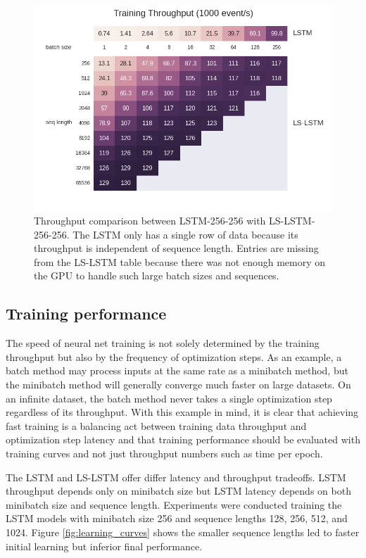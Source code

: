 \documentclass{article}
\begin{document}
\begin{figure}[t]
\centering
\includegraphics[width=12cm]{heatmap.png}
\caption{Throughput comparison between LSTM-256-256 with LS-LSTM-256-256. The LSTM only has a single row of data because its throughput is independent of sequence length. Entries are missing from the LS-LSTM table because there was not enough memory on the GPU to handle such large batch sizes and sequences.}
\label{fig:tp_perf}
\end{figure}

\subsection{Training performance}
The speed of neural net training is not solely determined by the training throughput but also by the frequency of optimization steps. As an example, a batch method may process inputs at the same rate as a minibatch method, but the minibatch method will generally converge much faster on large datasets. On an infinite dataset, the batch method never takes a single optimization step regardless of its throughput. With this example in mind, it is clear that achieving fast training is a balancing act between training data throughput and optimization step latency and that training performance should be evaluated with training curves and not just throughput numbers such as time per epoch.

The LSTM and LS-LSTM offer differ latency and throughput tradeoffs. LSTM throughput depends only on minibatch size but LSTM latency depends on both minibatch size and sequence length. Experiments were conducted training the LSTM models with minibatch size 256 and sequence lengths 128, 256, 512, and 1024. Figure \ref{fig:learning_curves} shows the smaller sequence lengths led to faster initial learning but inferior final performance. 
\end{document}
